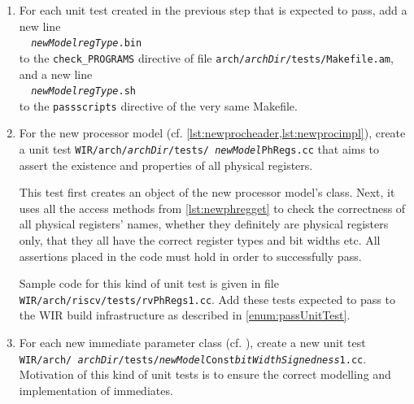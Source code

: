 \begin{enumerate}[resume]
  For this purpose, the new unit test needs to create a new virtual register of a given type first.
  Using a series of assertions, the abovementioned properties are verified for this virtual register.

  Next, various other virtual registers of the same type are created using the copy/move constructors and assignment operators.
  For all these other registers, their properties are again checked using assertions.
  Obviously, all these assertions must hold so that the entire unit test finally passes successfully.

  A representative code example for this kind of unit tests can be found in file \texttt{WIR/arch/riscv/tests/ rvReg1.cc}.

  \item For each unit test created in the previous step that is expected to pass, add a new line\label{enum:passUnitTest} \\
  \verb|  |\texttt{{\itshape newModelregType}.bin} \\
  to the \texttt{check\_PROGRAMS} directive of file \texttt{arch/{\itshape archDir}/tests/Makefile.am}, and a new line \\
  \verb|  |\texttt{{\itshape newModelregType}.sh} \\
  to the \texttt{passscripts} directive of the very same Makefile.

  \item For the new processor model (cf. \cref{lst:newprocheader,lst:newprocimpl}), create a unit test \texttt{WIR/arch/{\itshape archDir}/tests/ {\itshape newModel}PhRegs.cc} that aims to assert the existence and properties of all physical registers.

  This test first creates an object of the new processor model's class.
  Next, it uses all the access methods from \cref{lst:newphregget} to check the correctness of all physical registers' names, whether they definitely are physical registers only, that they all have the correct register types and bit widths etc.
  All assertions placed in the code must hold in order to successfully pass.

  Sample code for this kind of unit test is given in file \texttt{WIR/arch/riscv/tests/rvPhRegs1.cc}.
  Add these tests expected to pass to the \gls{WIR} build infrastructure as described in \cref{enum:passUnitTest}.

  \item For each new immediate parameter class (cf. ), create a new unit test \texttt{WIR/arch/ {\itshape archDir}/tests/{\itshape newModel}Const{\itshape bitWidthSignedness}1.cc}.
  Motivation of this kind of unit tests is to ensure the correct modelling and implementation of immediates.


\end{enumerate}
